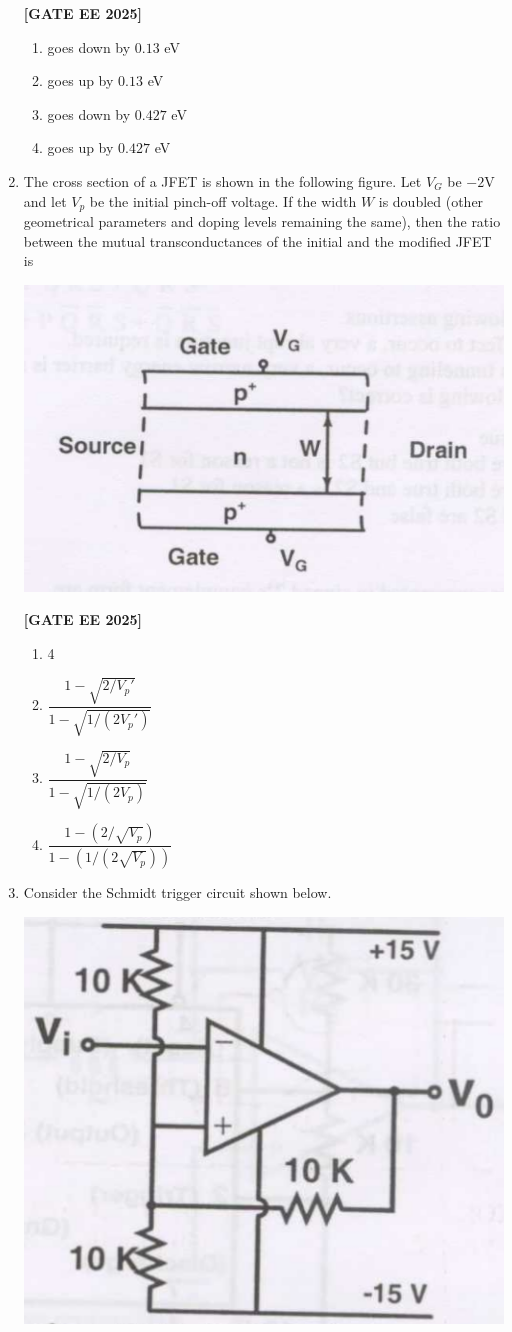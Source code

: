 \documentclass[12pt]{article}
\begin{document}
\begin{enumerate}[leftmargin=*, label=\textbf{Q.\arabic*:}]
\noindent \textbf{[GATE EE 2025]}
\begin{enumerate}
    \item goes down by $0.13$ eV
    \item goes up by $0.13$ eV
    \item goes down by $0.427$ eV
    \item goes up by $0.427$ eV
\end{enumerate}

\item The cross section of a JFET is shown in the following figure. Let $V_G$ be $-2$V and let $V_p$ be the initial pinch-off voltage. If the width $W$ is doubled (other geometrical parameters and doping levels remaining the same), then the ratio between the mutual transconductances of the initial and the modified JFET is

\begin{center}
\includegraphics[width=0.5\columnwidth]{figs/q52.png}
\end{center}
 
\noindent \textbf{[GATE EE 2025]}
\begin{enumerate}
    \item 4
    \item $\dfrac{1 - \sqrt{2/V_p'}}{1 - \sqrt{1/(2V_p')}}$
    \item $\dfrac{1 - \sqrt{2/V_p}}{1 - \sqrt{1/(2V_p)}}$
    \item $\dfrac{1 - (2/\sqrt{V_p})}{1 - (1/(2\sqrt{V_p}))}$
\end{enumerate}

\item Consider the Schmidt trigger circuit shown below.

\begin{center}
\includegraphics[width=0.5\columnwidth]{figs/q53.png}
\end{center}


\end{enumerate}
\end{document}
